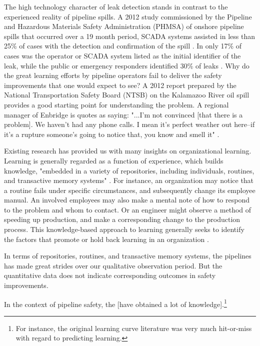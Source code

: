 \documentclass[12pt, man, natbib]{apa6}
\begin{document}
	The high technology character of leak detection stands in contrast to the experienced reality of pipeline spills. A 2012 study commissioned by the Pipeline and Hazardous Materials Safety Administration (PHMSA) of onshore pipeline spills that occurred over a 19 month period, SCADA systems assisted in less than 25\% of cases with the detection and confirmation of the spill \citep[p. 3-33]{Shaw2012}. In only 17\% of cases was the operator or SCADA system listed as the initial identifier of the leak, while the public or emergency responders identified 30\% of leaks \citep[p. 3-39]{Shaw2012}. Why do the great learning efforts by pipeline operators fail to deliver the safety improvements that one would expect to see? A 2012 report prepared by the National Transportation Safety Board (NTSB) on the Kalamazoo River oil spill provides a good starting point for understanding the problem. A regional manager of Enbridge is quotes as saying: "...I'm not convinced [that there is a problem]. We haven't had any phone calls. I mean it's perfect weather out here--if it's a rupture someone's going to notice that, you know and smell it" \citep[p. 100]{NTSB2012}.
	
	Existing research has provided us with many insights on organizational learning. Learning is generally regarded as a function of experience, which builds knowledge, "embedded in a variety of repositories, including individuals, routines, and transactive memory systems" \citep[p. 1124]{Argote 2011}. For instance, an organization may notice that a routine fails under specific circumstances, and subsequently change its employee manual. An involved employees may also make a mental note of how to respond to the problem and whom to contact. Or an engineer might observe a method of speeding up production, and make a corresponding change to the production process. This knowledge-based approach to learning generally seeks to identify the factors that promote or hold back learning in an organization \citep[e.g.,][p. 2]{Argote2013-1}.
	
	In terms of repositories, routines, and transactive memory systems, the pipelines has made great strides over our qualitative observation period. But the quantitative data does not indicate corresponding outcomes in safety improvements. 
	
	
	
	
	
	In the context of pipeline safety, the [have obtained a lot of knowledge].\footnote{For instance, the original learning curve literature was very much hit-or-miss with regard to predicting learning\citep[pp. 321f]{Levitt1988}.}
	

	
	
	
\end{document}
